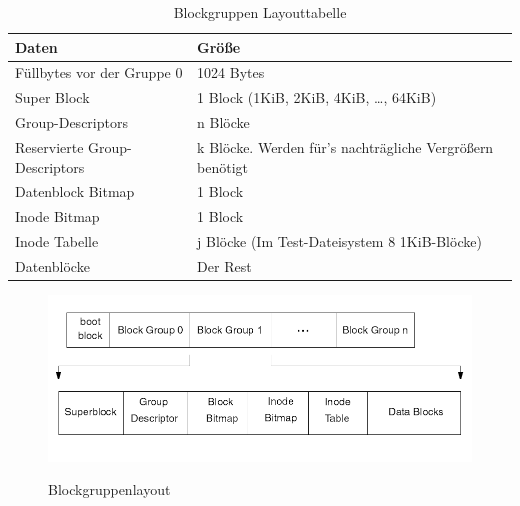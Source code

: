 \documentclass[11pt,a4paper]{article}
\begin{document}
\begin{table}[h!]
	\begin{center}
		\begin{tabular}[c]{| l | l |}
			\hline
			\cellcolor{grey} Daten & \cellcolor{grey} Größe \\ \hline
			Füllbytes vor der Gruppe 0 & 1024 Bytes \\ \hline
			Super Block & 1 Block (1KiB, 2KiB, 4KiB, \ldots, 64KiB) \\ \hline
			Group-Descriptors & n Blöcke  \\ \hline
			Reservierte Group-Descriptors & k Blöcke. Werden für's nachträgliche Vergrößern benötigt \\ \hline
			Datenblock Bitmap & 1 Block \\ \hline
			Inode Bitmap & 1 Block \\ \hline
			Inode Tabelle & j Blöcke (Im Test-Dateisystem 8 1KiB-Blöcke) \\ \hline
			Datenblöcke & Der Rest \\ \hline
		
		\end{tabular}
	\end{center}

	\caption{Blockgruppen Layouttabelle}
	\label{tab:block_layout}
\end{table}

\begin{figure}[h]
	\centering
	\caption{Blockgruppenlayout}
	\includegraphics[scale=0.4]{images/block_group_layout.png}
	\label{fig:block_group}
\end{figure}
\end{document}
